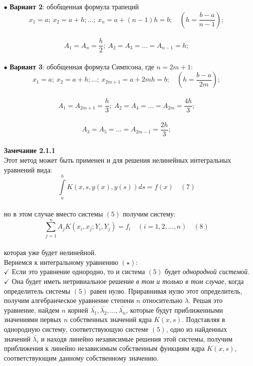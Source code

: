 \documentclass[12pt]{article}
\begin{document}
$ \bullet $ \textbf{Вариант 2}: обобщенная формула трапеций\\
$$ x_{1} = a; \: x_{2} = a+h; ...; \: x_{n} = a+(n-1)h = b; \quad (h = \frac{b-a}{n-1}); $$\\
$$ A_{1} = A_{n} = \frac{h}{2}; \: A_{2} = A_{3} = ... = A_{n-1} = h; $$\\
$ \bullet $ \textbf{Вариант 3}: обобщенная формула Симпсона, где $ n=2m+1 $: \\
$$  x_{1} = a; \: x_{2} = a+h; ...; \: x_{2m+1} = a+2mh = b; \quad (h = \frac{b-a}{2m}); $$\\
$$ A_{1} = A_{2m+1} = \frac{h}{3}; \: A_{2} = A_{4} = ... = A_{2m} = \frac{4h}{3}; $$\\
$$ A_{3} = A_{5} = ... = A_{2m-1} = \frac{2h}{3};  $$\\
\textbf{Замечание 2.1.1} \\
Этот метод может быть применен и для решения нелинейных интегральных уравнений вида:\\
$$ \int\limits_a^b K(x,s,y(x),y(s))ds = f(x) \quad (7) $$\\
но в этом случае вместо системы $ (5) $ получим систему: \\
$$ \sum\limits_{j=1}^n A_{j}K(x_{i},x_{j}; Y_{i}, Y_{j}) = f_{i} \quad (i =1,2, ..., n) \quad (8) $$\\
которая уже будет нелинейной.\\

Вернемся к интегральному уравнению $ (\star) $: \\

$ \checkmark $ Если это уравнение однородно, то и система $ (5) $ будет \textit{однородной системой}. \\

$ \checkmark $ Она будет иметь нетривиальное решение \textit{в том и только в том случае}, когда определитель системы $ (5) $ равен нулю. Приравнивая нулю этот определитель, получим алгебраическое уравнение степени $ n $ относительно $ \lambda $. Решая это уравнение, найдем $ n $ корней $ \bar{\lambda_{1}}, \bar{\lambda_{2}}, ..., \bar{\lambda_{n}} $, которые будут приближенными значениями первых $ n $ собственных значений ядра $ K(x,s) $. Подставляя в однородную систему, соответствующую системе $ (5) $, одно из найденных значений $ \bar{\lambda_{i}} $ и находя линейно независимые решения этой системы, получим приближения к линейно независимым собственным функциям ядра $ K(x,s) $, соответствующим данному собственному значению.\\
\end{document}
